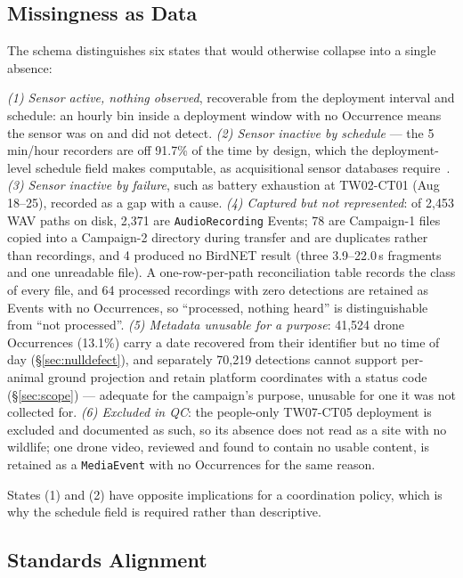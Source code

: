 \documentclass[sigconf]{acmart}
\begin{document}
\subsection{Missingness as Data}

The schema distinguishes six states that would otherwise collapse into a
single absence:

\emph{(1) Sensor active, nothing observed}, recoverable from the
deployment interval and schedule: an hourly bin inside a deployment
window with no Occurrence means the sensor was on and did not detect.
\emph{(2) Sensor inactive by schedule} --- the 5\,min/hour recorders are
off 91.7\% of the time by design, which the deployment-level schedule
field makes computable, as acquisitional sensor
databases require~\cite{madden2005tinydb}. \emph{(3) Sensor inactive by failure}, such as
battery exhaustion at TW02-CT01 (Aug 18--25), recorded as a gap with a
cause. \emph{(4) Captured but not represented}: of 2{,}453 WAV paths on
disk, 2{,}371 are \texttt{AudioRecording} Events; 78 are Campaign-1
files copied into a Campaign-2 directory during transfer and are
duplicates rather than recordings, and 4 produced no BirdNET result
(three 3.9--22.0\,s fragments and one unreadable file). A one-row-per-path
reconciliation table records the class of every file, and 64 processed
recordings with zero detections are retained as Events with no
Occurrences, so ``processed, nothing heard'' is distinguishable from
``not processed''.
\emph{(5) Metadata unusable for a purpose}: 41{,}524 drone Occurrences
(13.1\%) carry a date recovered from their identifier but no time of
day (\S\ref{sec:nulldefect}), and separately
70{,}219 detections cannot support per-animal ground projection and
retain platform coordinates with a status code (\S\ref{sec:scope}) ---
adequate for the campaign's purpose, unusable for one it was not
collected for. \emph{(6) Excluded in QC}: the people-only TW07-CT05
deployment is excluded and documented as such, so its absence does not
read as a site with no wildlife; one drone video, reviewed and found to
contain no usable content, is retained as a \texttt{MediaEvent} with no
Occurrences for the same reason.

States (1) and (2) have opposite implications for a coordination policy,
which is why the schedule field is required rather than descriptive.

\subsection{Standards Alignment}
\label{sec:crosswalk}
\end{document}

